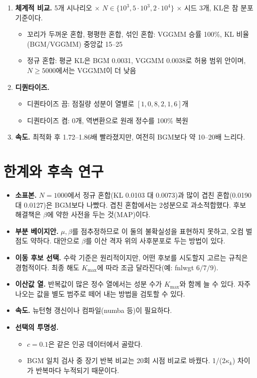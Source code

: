 \documentclass[11pt]{article}
\begin{document}
\begin{enumerate}
\begin{itemize}
    \end{itemize}
  \item \textbf{체계적 비교.} 5개 시나리오 $\times$ $N\in\{10^3,5\cdot10^3,2\cdot10^4\}$ $\times$ 시드 3개, KL은 참 분포 기준이다.
    \begin{itemize}
      \item 꼬리가 두꺼운 혼합, 평평한 혼합, 섞인 혼합: VGGMM 승률 100\%, KL 비율(BGM/VGGMM) 중앙값 15--25
      \item 정규 혼합: 평균 KL은 BGM 0.0031, VGGMM 0.0038로 허용 범위 안이며, $N\ge5000$에서는 VGGMM이 더 낮음
    \end{itemize}
  \item \textbf{디퀀타이즈.}
    \begin{itemize}
      \item 디퀀타이즈 끔: 점질량 성분이 열별로 $[1,0,8,2,1,6]$개
      \item 디퀀타이즈 켬: 0개, 역변환으로 원래 정수를 100\% 복원
    \end{itemize}
  \item \textbf{속도.} 최적화 후 1.72--1.86배 빨라졌지만, 여전히 BGM보다 약 10--20배 느리다.
\end{enumerate}

\section{한계와 후속 연구}
\begin{itemize}
  \item \textbf{소표본.} $N=1000$에서 정규 혼합(KL 0.0103 대 0.0073)과 많이 겹친 혼합(0.0190 대 0.0127)은 BGM보다 나빴다. 겹친 혼합에서는 2성분으로 과소적합했다. 후보 해결책은 $\beta$에 약한 사전을 두는 것(MAP)이다.
  \item \textbf{부분 베이지안.} $\mu,\beta$를 점추정하므로 이 둘의 불확실성을 표현하지 못하고, 오컴 벌점도 약하다. 대안으로 $\beta$를 이산 격자 위의 사후분포로 두는 방법이 있다.
  \item \textbf{이동 후보 선택.} 수락 기준은 원리적이지만, 어떤 후보를 시도할지 고르는 규칙은 경험적이다. 최종 해도 $K_{\max}$에 따라 조금 달라진다(예: fnlwgt $6/7/9$).
  \item \textbf{이산값 열.} 반복값이 많은 정수 열에서는 성분 수가 $K_{\max}$와 함께 늘 수 있다. 자주 나오는 값을 별도 범주로 떼어 내는 방법을 검토할 수 있다.
  \item \textbf{속도.} 뉴턴형 갱신이나 컴파일(numba 등)이 필요하다.
  \item \textbf{선택의 투명성.}
    \begin{itemize}
      \item $c=0.1$은 같은 인공 데이터에서 골랐다.
      \item BGM 일치 검사 중 장기 반복 비교는 20회 시점 비교로 바꿨다. 1/(2$\kappa_k$) 차이가 반복마다 누적되기 때문이다.
    \end{itemize}
\end{itemize}
\end{document}
